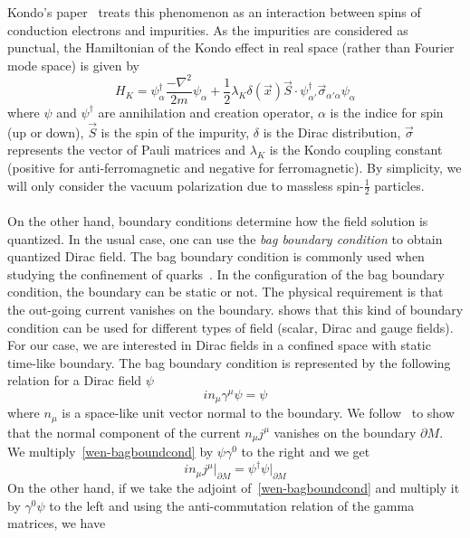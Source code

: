 Kondo's paper~\cite{Kondo1964} treats this phenomenon as an interaction between spins of conduction electrons and impurities.
As the impurities are considered as punctual,
the Hamiltonian of the Kondo effect in real space (rather than Fourier mode space) is given by~\cite{Erdmenger2013}
\begin{equation}\label{vacuum-kondohamiltonian}
H_K = \psi_\alpha^\dagger \frac{-\nabla^2}{2m}\psi_\alpha +
\frac 1 2\lambda_K \delta(\vec{x})\vec{S}\cdot \psi_{\alpha'}^\dagger  \vec{\sigma}_{\alpha' \alpha} \psi_\alpha
\end{equation}
where $\psi$ and $\psi^\dagger$ are annihilation and creation operator, 
$\alpha$ is the indice for spin (up or down), 
$\vec{S}$ is the spin of the impurity,
$\delta$ is the Dirac distribution,
$\vec{\sigma}$ represents the vector of Pauli matrices and $\lambda_K$ is the Kondo coupling constant (positive for anti-ferromagnetic and negative for ferromagnetic).
By simplicity, we will only consider the vacuum polarization due to massless spin-$\frac 1 2$ particles. \\\\
%
On the other hand, boundary conditions determine how the field solution is quantized.
In the usual case, one can use the \textit{bag boundary condition} to obtain quantized Dirac field.
The bag boundary condition is commonly used when studying the confinement of quarks~\cite{Hasenfratz1978}.
In the configuration of the bag boundary condition, the boundary can be static or not. 
The physical requirement is that the out-going current vanishes on the boundary.
\cite{Chodos1974} shows that this kind of boundary condition can be used for different types of field (scalar, Dirac and gauge fields). 
For our case, we are interested in Dirac fields in a confined space with static time-like boundary.
The bag boundary condition is represented by the following relation for a Dirac field $\psi$ 
\begin{equation}\label{wen-bagboundcond}
i n_\mu\gamma^\mu \psi = \psi
\end{equation}
where $n_\mu$ is a space-like unit vector normal to the boundary.
We follow~\cite{Stokes2015} to show that the normal component of the current $n_\mu j^\mu$ vanishes on the boundary $\partial M$.
We multiply~\cref{wen-bagboundcond} by $\psi\gamma^0$ to the right and we get
\begin{equation*}
i n_\mu j^\mu \big\vert_{\partial M}= \psi^\dagger\psi \big\vert_{\partial M}
\end{equation*}
On the other hand, if we take the adjoint of~\cref{wen-bagboundcond} and multiply it by $\gamma^0\psi$ to the left and using the anti-commutation relation of the gamma matrices, we have
